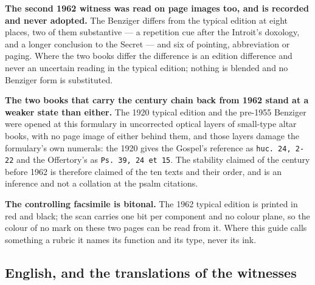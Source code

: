 \textbf{The second 1962 witness was read on page images too, and is recorded and
never adopted.} The Benziger  differs from the
typical edition at eight places, two of them substantive --- a repetition cue
after the Introit's doxology, and a longer conclusion to the Secret --- and six
of pointing, abbreviation or paging. Where the two books differ the difference
is an edition difference and never an uncertain reading in the typical edition;
nothing is blended and no Benziger form is substituted.

\textbf{The two books that carry the century chain back from 1962 stand at a
weaker state than either.} The 1920 typical edition and the pre-1955 Benziger
were opened at this formulary in uncorrected optical layers of small-type altar
books, with no page image of either behind them, and those layers damage the
formulary's own numerals: the 1920 gives the Gospel's reference as \texttt{huc.
24, 2-22} and the Offertory's as \texttt{Ps. 39, 24 et 15}. The stability
claimed of the century before 1962 is therefore claimed of the ten texts and
their order, and is an inference and not a collation at the psalm citations.

\textbf{The controlling facsimile is bitonal.} The 1962 typical edition is
printed in red and black; the scan carries one bit per component and no colour
plane, so the colour of no mark on these two pages can be read from it. Where
this guide calls something a rubric it names its function and its type, never
its ink.

\subsection*{English, and the translations of the witnesses}

